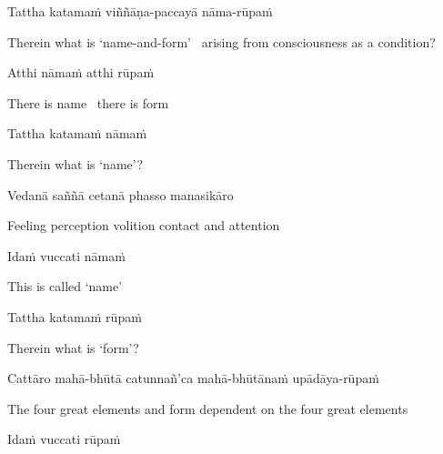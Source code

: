 Tattha katamaṁ viññāṇa-paccayā nāma-rūpaṁ

\begin{english-hang}
  Therein what is `name-and-form' \breathmark\ arising from consciousness as a condition?
\end{english-hang}

Atthi nāmaṁ atthi rūpaṁ

\begin{english}
  There is name \breathmark\ there is form
\end{english}

Tattha katamaṁ nāmaṁ

\begin{english}
  Therein what is `name'?
\end{english}

Vedanā saññā cetanā phasso manasikāro\makeatletter\hyperlink{endnote80-appendix}\makeatother

\begin{english}
  Feeling perception volition contact and attention
\end{english}

Idaṁ vuccati nāmaṁ

\begin{english}
  This is called `name'
\end{english}

Tattha katamaṁ rūpaṁ

\begin{english}
  Therein what is `form'?
\end{english}

Cattāro mahā-bhūtā catunnañ'ca mahā-bhūtānaṁ upādāya-rūpaṁ

\begin{english-hang}
  The four great elements and form dependent on the four great elements
\end{english-hang}

Idaṁ vuccati rūpaṁ

